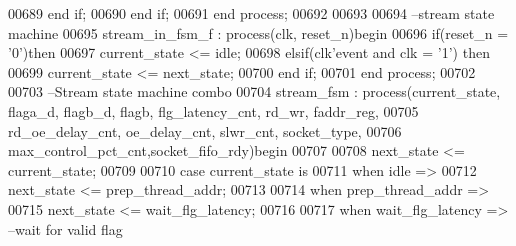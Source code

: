 \begin{DoxyCode}
00689         \textcolor{keywordflow}{end} \textcolor{keywordflow}{if};
00690     \textcolor{keywordflow}{end} \textcolor{keywordflow}{if}; 
00691 \textcolor{keywordflow}{end} \textcolor{keywordflow}{process};
00692 
00693 
00694 \textcolor{keyword}{--stream state machine}
00695 stream\_in\_fsm\_f : \textcolor{keywordflow}{process}(clk, reset_n)\textcolor{keywordflow}{begin}
00696     \textcolor{keywordflow}{if}\textcolor{vhdlchar}{(}\textcolor{vhdlchar}{reset_n} \textcolor{vhdlchar}{=} \textcolor{vhdlchar}{'}\textcolor{vhdllogic}{}\textcolor{vhdllogic}{0}\textcolor{vhdlchar}{'}\textcolor{vhdlchar}{)}\textcolor{keywordflow}{then} 
00697         \textcolor{vhdlchar}{current_state} \textcolor{vhdlchar}{<=} \textcolor{vhdlchar}{idle};
00698     \textcolor{keywordflow}{elsif}\textcolor{vhdlchar}{(}\textcolor{vhdlchar}{clk}\textcolor{vhdlchar}{'}\textcolor{vhdlkeyword}{event} \textcolor{keywordflow}{and} \textcolor{vhdlchar}{clk} \textcolor{vhdlchar}{=} \textcolor{vhdlchar}{'}\textcolor{vhdllogic}{}\textcolor{vhdllogic}{1}\textcolor{vhdlchar}{'}\textcolor{vhdlchar}{)} \textcolor{keywordflow}{then} 
00699         \textcolor{vhdlchar}{current_state} \textcolor{vhdlchar}{<=} \textcolor{vhdlchar}{next_state};
00700     \textcolor{keywordflow}{end} \textcolor{keywordflow}{if}; 
00701 \textcolor{keywordflow}{end} \textcolor{keywordflow}{process};
00702 
00703 \textcolor{keyword}{--Stream state machine combo}
00704 stream\_fsm : \textcolor{keywordflow}{process}(current_state, flaga_d, flagb_d, flagb, flg_latency_cnt, 
      rd_wr, faddr_reg,
00705                             rd_oe_delay_cnt, oe_delay_cnt, slwr_cnt, socket_type, 
00706                             max_control_pct_cnt,socket_fifo_rdy)\textcolor{keywordflow}{begin}
00707                             
00708     \textcolor{vhdlchar}{next_state} \textcolor{vhdlchar}{<=} \textcolor{vhdlchar}{current_state};
00709     
00710     \textcolor{keywordflow}{case} \textcolor{vhdlchar}{current_state} \textcolor{keywordflow}{is}
00711     \textcolor{keywordflow}{when} \textcolor{vhdlchar}{idle} \textcolor{vhdlchar}{=}\textcolor{vhdlchar}{>}                            
00712         \textcolor{vhdlchar}{next_state} \textcolor{vhdlchar}{<=} \textcolor{vhdlchar}{prep\_thread\_addr};
00713         
00714     \textcolor{keywordflow}{when} \textcolor{vhdlchar}{prep\_thread\_addr} \textcolor{vhdlchar}{=}\textcolor{vhdlchar}{>} 
00715         \textcolor{vhdlchar}{next_state} \textcolor{vhdlchar}{<=} \textcolor{vhdlchar}{wait\_flg\_latency};
00716         
00717     \textcolor{keywordflow}{when} \textcolor{vhdlchar}{wait\_flg\_latency} \textcolor{vhdlchar}{=}\textcolor{vhdlchar}{>}\textcolor{keyword}{        --wait for valid flag}

\end{DoxyCode}
